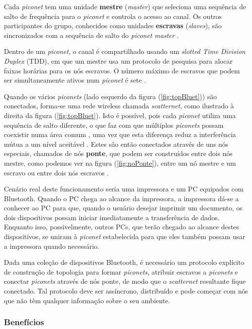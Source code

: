 \documentclass[conference]{IEEEtran}
\begin{document}
Cada \textit{piconet} tem uma unidade \textbf{mestre} (\textit{master}) que seleciona uma sequência de salto de frequência para o \textit{piconet} e controla o acesso ao canal. 
Os outros participantes do grupo, conhecidos como unidades \textbf{escravas} (\textit{slaves}), são sincronizados com a sequência de salto do \textit{piconet master} \cite{salonidis2005distributed}. 

Dentro de um \textit{piconet}, o canal é compartilhado usando um \textit{slotted Time Division Duplex} (TDD), em que um mestre usa um protocolo de pesquisa para alocar faixas horárias para os nós escravos. O número máximo de escravos que podem ser simultaneamente ativos num \textit{piconet} é sete	.

Quando os vários \textit{piconets} (lado esquerdo da figura (\ref{fig:topBluet})) são conectados, forma-se uma rede wireless chamada \textit{scatternet}, como ilustrado à direita da figura (\ref{fig:topBluet}).
Isto é possível, pois cada \textit{piconet} utiliza uma sequência de salto diferente, o que faz com que múltiplos \textit{piconets} possam coexistir numa área comum \cite{salonidis2005distributed}, uma vez que esta diferença reduz a interferência mútua a um nível aceitável \cite{prasad2004ofdm}. 
Estes são então conectados através de uns nós especiais, chamados de nós \textbf{ponte}, que podem ser construídos entre dois nós mestre, como podemos ver na figura (\ref{fig:noPonte}), entre um nó mestre e um escravo ou entre dois nós escravos \cite{salonidis2005distributed}.

Cenário real deste funcionamento seria uma impressora e um PC equipados com Bluetooth. Quando o PC chega ao alcance da impressora, a impressora dá-se a conhecer ao PC para que, quando o usuário desejar imprimir um documento, os dois dispositivos possam iniciar imediatamente a transferência de dados. Enquanto isso, possivelmente, outros PCs, que terão chegado ao alcance destes dispositivos, se uniram à \textit{piconet} estabelecida para que eles também possam usar a impressora quando necessário.

Dada uma coleção de dispositivos Bluetooth, é necessário um protocolo explícito de construção de topologia para formar \textit{piconets}, atribuir escravos a \textit{piconets} e conectar \textit{piconets} através de nós ponte, de modo que o \textit{scatternet} resultante fique conectado. Tal protocolo deve ser assíncrono, distribuído e pode começar com nós que não têm qualquer informação sobre o seu ambiente.

\subsubsection{Benefícios}
\end{document}
